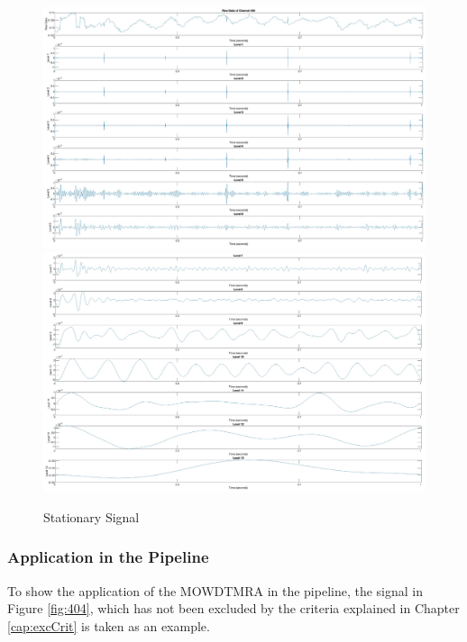 \begin{figure}[p]
    \centering
    \includegraphics[width=\textwidth]{img/lev1.png}
    \includegraphics[width=\textwidth]{img/lev2.png}
    \caption{Stationary Signal}
    \label{fig:level1}
\end{figure}

\subsubsection{Application in the Pipeline}
To show the application of the MOWDTMRA in the pipeline, the signal in Figure \ref{fig:404}, which has not been excluded by the criteria explained in Chapter \ref{cap:excCrit} is taken as an example.

